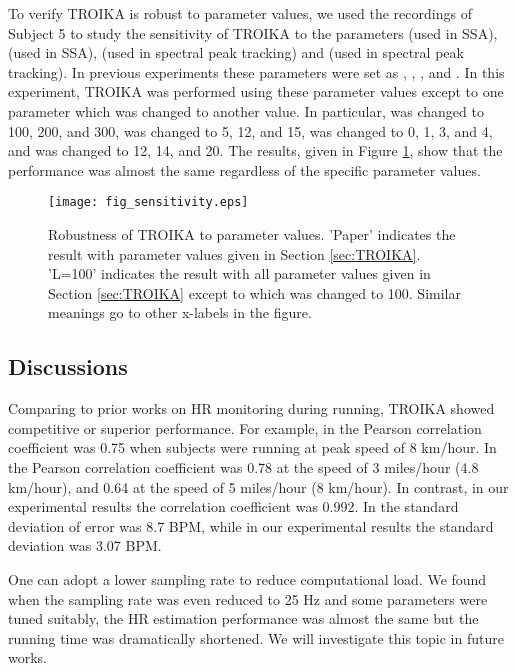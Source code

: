 \documentclass[10pt,twocolumn]{IEEEtran}
\begin{document}
To verify TROIKA is robust to parameter values, we used the recordings of Subject 5 to study the sensitivity of TROIKA to the parameters  (used in SSA),  (used in SSA),  (used in spectral peak tracking) and  (used in spectral peak tracking). In previous experiments these parameters were set as , , , and . In this experiment, TROIKA was performed using these parameter values except to one parameter which was changed to another value. In particular,  was changed to 100, 200, and 300,  was changed to 5, 12, and 15,  was changed to 0, 1, 3, and 4, and  was changed to 12, 14, and 20. The results, given in Figure \ref{fig:sensitivity}, show that the performance was almost the same regardless of the specific parameter values.

\begin{figure}[t]
\centering
\texttt{[image: fig\_sensitivity.eps]}
\caption{Robustness of TROIKA to parameter values. 'Paper' indicates the result with parameter values given in Section \ref{sec:TROIKA}. 'L=100' indicates the result with all parameter values given in Section \ref{sec:TROIKA} except to  which was changed to 100. Similar meanings go to other x-labels in the figure.}
\label{fig:sensitivity}
\end{figure}






\subsection{Discussions}

Comparing to prior works on HR monitoring during running, TROIKA showed competitive or superior performance. For example, in \cite{poh2010motion} the Pearson correlation coefficient was 0.75 when subjects were running at peak speed of 8 km/hour. In \cite{yousefi2013ANC} the Pearson correlation coefficient was 0.78 at the speed of 3 miles/hour (4.8 km/hour), and 0.64 at the speed of 5 miles/hour (8 km/hour). In contrast, in our experimental results the correlation coefficient was 0.992. In \cite{fukushima2012SpectrumSubtraction} the standard deviation of error was 8.7 BPM, while in our experimental results the standard deviation was 3.07 BPM.

One can adopt a lower sampling rate to reduce computational load. We found when the sampling rate was even reduced to 25 Hz and some parameters were tuned suitably, the HR estimation performance was  almost the same but the running time was dramatically shortened. We will investigate this topic in future works.
\end{document}
